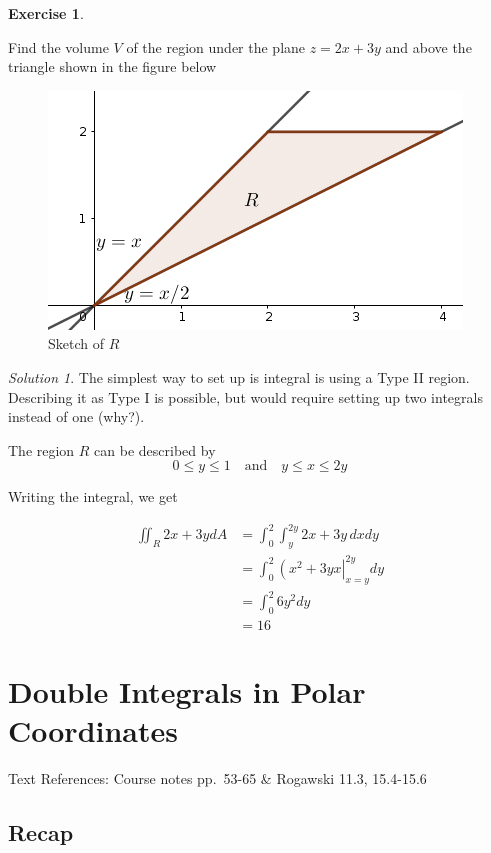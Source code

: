\documentclass[
]{book}
\theoremstyle{definition}
\theoremstyle{definition}
\theoremstyle{definition}
\newtheorem{exercise}{Exercise}[chapter]
\theoremstyle{definition}
\theoremstyle{remark}
\newtheorem*{solution}{Solution}
\begin{document}
\begin{exercise}
\protect\hypertarget{exr:unlabeled-div-87}{}\label{exr:unlabeled-div-87}

Find the volume \(V\) of the region under the plane \(z=2x+3y\) and above the triangle shown in the figure below

\begin{figure}

{\centering \includegraphics[width=0.3\linewidth]{images/lec-11-4} 

}

\caption{Sketch of $R$}\label{fig:unnamed-chunk-23}
\end{figure}

\end{exercise}

\begin{solution}

The simplest way to set up is integral is using a Type II region. Describing it as Type I is possible, but would require setting up two integrals instead of one (why?).

The region \(R\) can be described by \[0\leq y\leq 1 \quad \mbox{and}\quad y\leq x \leq 2y\]

Writing the integral, we get

\begin{align*}
\displaystyle \iint_R 2x+3y dA & = \int_0^2\int_y^{2y}2x+3y \, dx dy \\
&= \int_0^2 \left (x^2+3yx \right |_{x=y}^{2y} dy\\
&= \int_0^2 6y^2 dy \\
&= 16
\end{align*}

\end{solution}

\hypertarget{lec-12}{%
\chapter{Double Integrals in Polar Coordinates}\label{lec-12}}

Text References: Course notes pp.~53-65 \& Rogawski 11.3, 15.4-15.6

\hypertarget{recap-10}{%
\section{Recap}\label{recap-10}}
\end{document}
